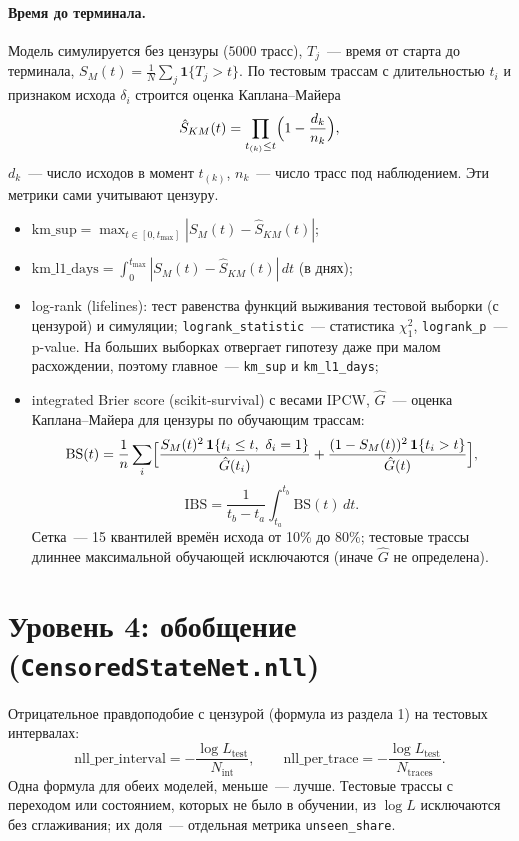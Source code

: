 \documentclass[11pt,a4paper]{article}
\newcommand{\code}[1]{\texttt{#1}}
\newcommand{\1}{\mathbf{1}}
\begin{document}
\paragraph{Время до терминала.} Модель симулируется без цензуры ($5000$ трасс),
$T_j$~--- время от старта до терминала, $S_M(t)=\frac1N\sum_j\1\{T_j>t\}$.
По тестовым трассам с длительностью $t_i$ и признаком исхода $\delta_i$ строится
оценка Каплана--Майера
\[
\hat S_{KM}(t)=\prod_{t_{(k)}\le t}\Bigl(1-\frac{d_k}{n_k}\Bigr),
\]
$d_k$~--- число исходов в момент $t_{(k)}$, $n_k$~--- число трасс под наблюдением.
Эти метрики сами учитывают цензуру.
\begin{itemize}
\item $\mathrm{km\_sup}=\max_{t\in[0,t_{\max}]}|S_M(t)-\hat S_{KM}(t)|$;
\item $\mathrm{km\_l1\_days}=\int_0^{t_{\max}}|S_M(t)-\hat S_{KM}(t)|\,dt$ (в днях);
\item log-rank (lifelines): тест равенства функций выживания тестовой выборки
  (с цензурой) и симуляции; \code{logrank\_statistic}~--- статистика $\chi^2_1$,
  \code{logrank\_p}~--- p-value. На больших выборках отвергает гипотезу даже при малом
  расхождении, поэтому главное~--- \code{km\_sup} и \code{km\_l1\_days};
\item integrated Brier score (scikit-survival) с весами IPCW, $\hat G$~--- оценка
  Каплана--Майера для цензуры по обучающим трассам:
\[
\mathrm{BS}(t)=\frac1n\sum_i\Bigl[\frac{S_M(t)^2\,\1\{t_i\le t,\ \delta_i=1\}}{\hat G(t_i)}
+\frac{(1-S_M(t))^2\,\1\{t_i>t\}}{\hat G(t)}\Bigr],
\]
\[
\mathrm{IBS}=\frac{1}{t_b-t_a}\int_{t_a}^{t_b}\mathrm{BS}(t)\,dt.
\]
  Сетка~--- 15 квантилей времён исхода от 10\% до 80\%; тестовые трассы длиннее
  максимальной обучающей исключаются (иначе $\hat G$ не определена).
\end{itemize}

\section{Уровень 4: обобщение (\code{CensoredStateNet.nll})}

Отрицательное правдоподобие с цензурой (формула из раздела 1) на тестовых интервалах:
\[
\mathrm{nll\_per\_interval}=-\frac{\log L_{\mathrm{test}}}{N_{\mathrm{int}}},\qquad
\mathrm{nll\_per\_trace}=-\frac{\log L_{\mathrm{test}}}{N_{\mathrm{traces}}}.
\]
Одна формула для обеих моделей, меньше~--- лучше. Тестовые трассы с переходом или
состоянием, которых не было в обучении, из $\log L$ исключаются без сглаживания; их доля~---
отдельная метрика \code{unseen\_share}.
\end{document}
